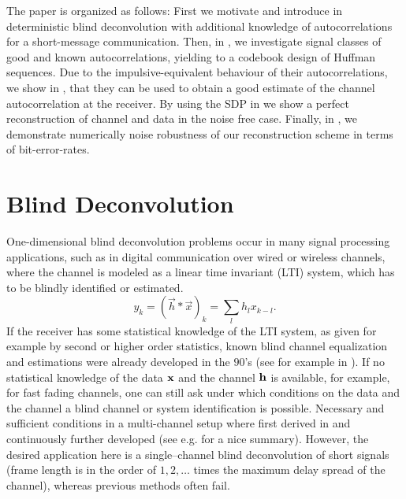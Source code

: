 \documentclass[conference]{IEEEtran}
\begin{document}
The paper is organized as follows: First we motivate and introduce in  deterministic blind
deconvolution with additional knowledge of autocorrelations for a short-message communication. Then, in
, we investigate signal classes of good and known autocorrelations, yielding to a
codebook design of Huffman sequences. Due to the impulsive-equivalent behaviour of their autocorrelations, we show in
, that they can be used to obtain a good estimate  of the channel autocorrelation at the receiver.
By using the SDP in \cite{JH16} we show a perfect reconstruction of channel and data in the noise free case. Finally, in
, we demonstrate numerically noise robustness of our reconstruction scheme in terms of
bit-error-rates.  

\section{Blind Deconvolution}\label{sec:blinddeconv}

One-dimensional blind deconvolution problems occur in many signal processing applications, such as in digital communication over wired
or wireless channels, where the channel is modeled as a linear time invariant (LTI) system, which has to be blindly
identified or estimated. 
%
\begin{equation}
  y_k=(\vec{h}\ast \vec{x})_k=\sum_{l}h_lx_{k-l}\label{eq:convtime}.
\end{equation}
%
If the receiver has some statistical knowledge of the LTI system, as given for example by second or higher order
statistics, known blind channel equalization and estimations were already developed in the $90$'s (see for example in
\cite{TXK91,DKAJ91,TXHK95}).  If no statistical knowledge of the data ${\mathbf x}$  and the channel ${\mathbf h}$ is available, for example, for
fast fading channels, one can still ask under which conditions on the data and the channel a blind channel or system
identification is possible. Necessary and sufficient conditions in a multi-channel setup where first derived in
\cite{XLTK95} and continuously further developed (see e.g.  \cite{A-MQH97} for a nice summary).  However, the desired
application here is a single--channel blind deconvolution of short signals (frame length is in the order of $1,2,\dots$
times the maximum delay spread of the channel), whereas previous methods often fail.
\end{document}
